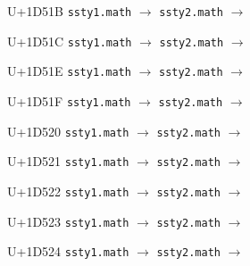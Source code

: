 \documentclass{article}
\begin{document}
\begin{substitutions}
\goodbreak

U+1D51B  \linebreak
    \texttt{ssty1.math} $\to$  \linebreak
    \texttt{ssty2.math} $\to$  

\goodbreak

U+1D51C  \linebreak
    \texttt{ssty1.math} $\to$  \linebreak
    \texttt{ssty2.math} $\to$  

\goodbreak

U+1D51E  \linebreak
    \texttt{ssty1.math} $\to$  \linebreak
    \texttt{ssty2.math} $\to$  

\goodbreak

U+1D51F  \linebreak
    \texttt{ssty1.math} $\to$  \linebreak
    \texttt{ssty2.math} $\to$  

\goodbreak

U+1D520  \linebreak
    \texttt{ssty1.math} $\to$  \linebreak
    \texttt{ssty2.math} $\to$  

\goodbreak

U+1D521  \linebreak
    \texttt{ssty1.math} $\to$  \linebreak
    \texttt{ssty2.math} $\to$  

\goodbreak

U+1D522  \linebreak
    \texttt{ssty1.math} $\to$  \linebreak
    \texttt{ssty2.math} $\to$  

\goodbreak

U+1D523  \linebreak
    \texttt{ssty1.math} $\to$  \linebreak
    \texttt{ssty2.math} $\to$  

\goodbreak

U+1D524  \linebreak
    \texttt{ssty1.math} $\to$  \linebreak
    \texttt{ssty2.math} $\to$  


\end{substitutions}
\end{document}
